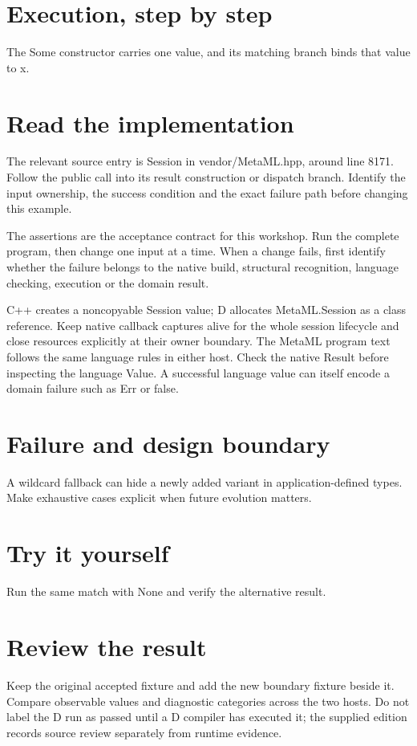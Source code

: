
\section*{Execution, step by step}
The Some constructor carries one value, and its matching branch binds that value to x.

\section*{Read the implementation}
The relevant source entry is Session in vendor/MetaML.hpp, around line 8171. Follow the public call into its result construction or dispatch branch. Identify the input ownership, the success condition and the exact failure path before changing this example.

The assertions are the acceptance contract for this workshop. Run the complete program, then change one input at a time. When a change fails, first identify whether the failure belongs to the native build, structural recognition, language checking, execution or the domain result.

\clearpage
{}
C++ creates a noncopyable Session value; D allocates MetaML.Session as a class reference. Keep native callback captures alive for the whole session lifecycle and close resources explicitly at their owner boundary. The MetaML program text follows the same language rules in either host. Check the native Result before inspecting the language Value. A successful language value can itself encode a domain failure such as Err or false.


\section*{Failure and design boundary}
A wildcard fallback can hide a newly added variant in application-defined types. Make exhaustive cases explicit when future evolution matters.

\section*{Try it yourself}
Run the same match with None and verify the alternative result.

\section*{Review the result}
Keep the original accepted fixture and add the new boundary fixture beside it. Compare observable values and diagnostic categories across the two hosts. Do not label the D run as passed until a D compiler has executed it; the supplied edition records source review separately from runtime evidence.

